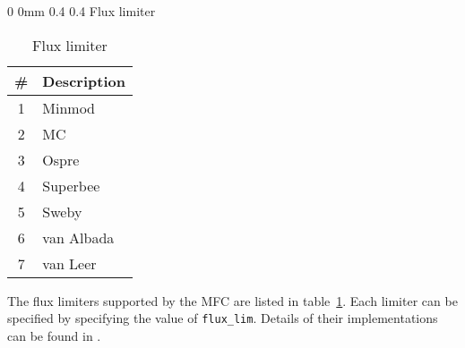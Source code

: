 \documentclass[11pt]{article}
\makeatletter
\renewcommand{\section}{\@startsection
{section}%
{0}%
{0mm}%
{0.4\baselineskip}%
{0.4\baselineskip}%
{\normalfont\Large\bfseries\color{myBrown}}}%
\newcommand\tablefont{\footnotesize}
\makeatother
\begin{document}
\section{Flux limiter}\label{s:fl}

\begin{table}[H]
    \centering
	{\tablefont
	\begin{tabular}{ | c |  l | }
	\hline
		\textbf{\#} & \bf Description  \\
		\hline
		1 & Minmod \\
		2 & MC \\
		3 & Ospre  \\
		4 & Superbee \\
		5 & Sweby \\
		6 & van Albada\\
		7 & van Leer\\
		\hline
	\end{tabular}}
	\caption{Flux limiter}
	\label{t:fl}
\end{table}

The flux limiters supported by the MFC are listed in table~\ref{t:fl}. Each limiter can be specified by specifying the value of \texttt{flux_lim}. Details of their implementations can be found in \citet{Meng16}.
\end{document}
